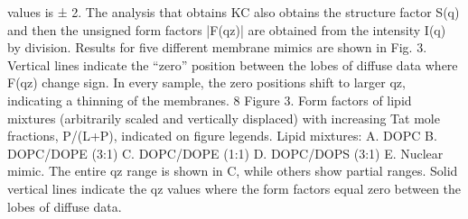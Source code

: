 values is ± 2.
The analysis that obtains KC also obtains the structure factor S(q) and then the unsigned
form factors |F(qz)| are obtained from the intensity I(q) by division. Results for five different
membrane mimics are shown in Fig. 3. Vertical lines indicate the “zero” position between the
lobes of diffuse data where F(qz) change sign. In every sample, the zero positions shift to larger
qz, indicating a thinning of the membranes.
8
Figure 3. Form factors of lipid mixtures (arbitrarily scaled and vertically displaced) with
increasing Tat mole fractions, P/(L+P), indicated on figure legends. Lipid mixtures: A. DOPC
B. DOPC/DOPE (3:1) C. DOPC/DOPE (1:1) D. DOPC/DOPS (3:1) E. Nuclear mimic. The
entire qz range is shown in C, while others show partial ranges. Solid vertical lines indicate the
qz values where the form factors equal zero between the lobes of diffuse data.

